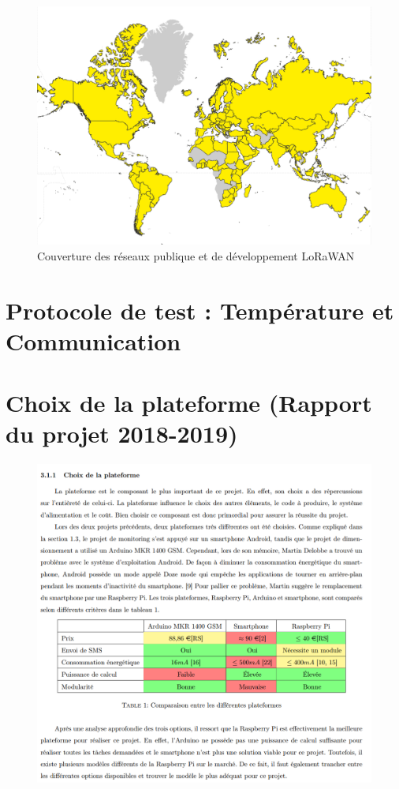 \begin{figure}[h!]
  \centering
  \includegraphics[scale=0.5]{img/state_of_the_art/lora_cov_dev.png}
  \caption{Couverture des réseaux publique et de développement LoRaWAN \cite{lora_map}}
  \label{fig:cov_lora_map}
\end{figure}





\chapter{Protocole de test : Température et Communication}
\label{ap:teeeest}




\chapter{Choix de la plateforme (Rapport du projet 2018-2019)}
\label{ap:choix}

\begin{figure}
  \includegraphics[width=\textwidth]{img/annexe/prev1.png}

\end{figure}

